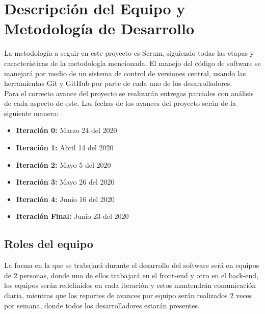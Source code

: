\documentclass[a4paper,12 pt]{article}
\begin{document}
\section{Descripción del Equipo y Metodología de Desarrollo}

La metodología a seguir en este proyecto es Scrum, siguiendo todas las etapas y
características de la metodología mencionada. El manejo del código de software se
manejará por medio de un sistema de control de versiones central, usando las
herramientas Git y GitHub por parte de cada uno de los desarrolladores. \\

Para el correcto avance del proyecto se realizarán entregas parciales con análisis de
cada aspecto de este. Las fechas de los avances del proyecto serán de la siguiente
manera:

\begin{itemize}
    \item \textbf{Iteración 0:} Marzo 24 del 2020
    \item \textbf{Iteración 1:} Abril 14 del 2020
    \item \textbf{Iteración 2:} Mayo 5 del 2020
    \item \textbf{Iteración 3:} Mayo 26 del 2020
    \item \textbf{Iteración 4:} Junio 16 del 2020
    \item \textbf{Iteración Final:} Junio 23 del 2020
\end{itemize}{}

\subsection{Roles del equipo}

La forma en la que se trabajará durante el desarrollo del software será en equipos de 2
personas, donde uno de ellos trabajará en el front-end y otro en el back-end, los
equipos serán redefinidos en cada iteración y estos mantendrán comunicación diaria,
mientras que los reportes de avances por equipo serán realizados 2 veces por semana,
donde todos los desarrolladores estarán presentes.
\end{document}
